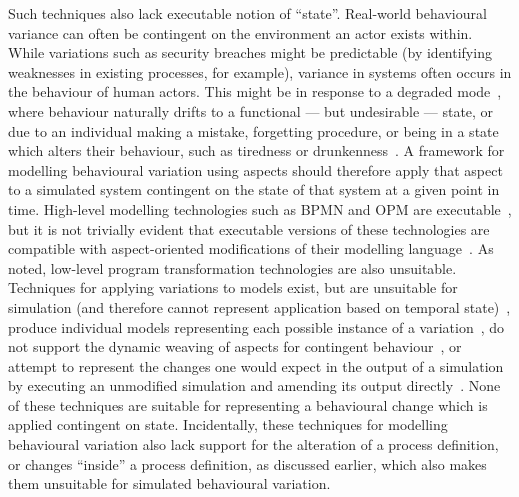 Such techniques also lack executable notion of ``state''. Real-world behavioural
variance can often be contingent on the environment an actor exists within.
While variations such as security breaches might be predictable (by identifying
weaknesses in existing processes, for example), variance in \sociotechnical
systems often occurs in the behaviour of human actors. This might be in response
to a degraded mode~\cite{johnson2007degradedmodes}, where behaviour naturally
drifts to a functional --- but undesirable --- state, or due to an individual
making a mistake, forgetting procedure, or being in a state which alters their
behaviour, such as tiredness or drunkenness~\cite{aranTheatreThesis}. A
framework for modelling behavioural variation using aspects should therefore
apply that aspect to a simulated system contingent on the state of that system
at a given point in time. High-level modelling technologies such as BPMN and OPM
are executable~\cite{ExecutableBPMNMitsyuk,opm_original}, but it is not trivially
evident that executable versions of these technologies are compatible with
aspect-oriented modifications of their modelling
language~\cite{charfi2010AO4BPMN,Cappelli_AOBPM}. As noted, low-level program
transformation technologies are also unsuitable. Techniques for applying
variations to models exist, but are unsuitable for simulation (and therefore
cannot represent application based on temporal state)~\cite{stocker2013secsy},
produce individual models representing each possible instance of a
variation~\cite{pourmasoumi2015business}, do not support the dynamic weaving of
aspects for contingent behaviour~\cite{Machado_2011}, or attempt to represent
the changes one would expect in the output of a simulation by executing an
unmodified simulation and amending its output
directly~\cite{shugurov2014generation}. None of these techniques are suitable
for representing a behavioural change which is applied contingent on state.
Incidentally, these techniques for modelling behavioural variation also lack
support for the alteration of a process definition, or changes ``inside'' a
process definition, as discussed earlier, which also makes them unsuitable for
simulated behavioural variation.

